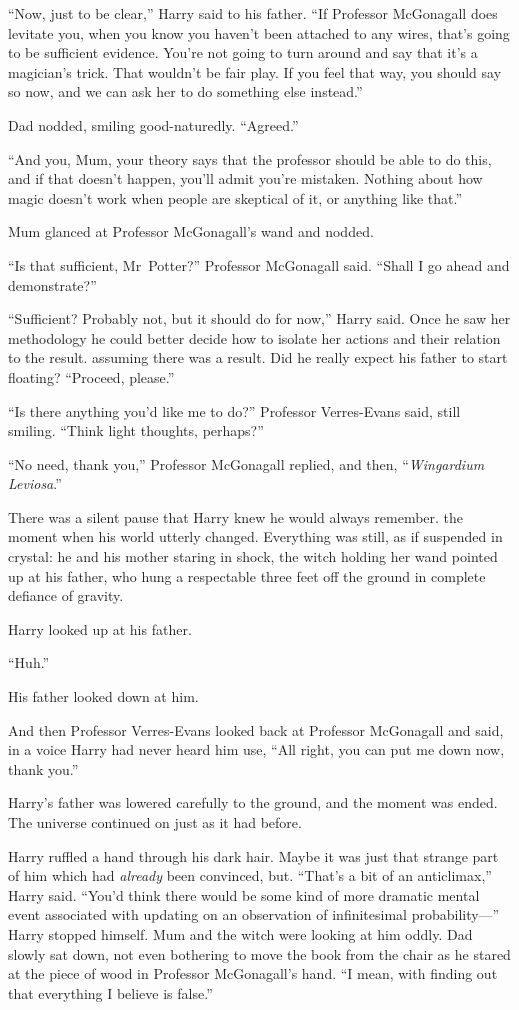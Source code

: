 “Now, just to be clear,” Harry said to his father. “If Professor
McGonagall does levitate you, when you know you haven’t
been attached to any wires, that’s going to be sufficient
evidence. You’re not going to turn around and say that it’s
a magician’s trick. That wouldn’t be fair play. If you feel
that way, you should say so now, and we can ask her to
do something else instead.”

Dad nodded, smiling good-naturedly. “Agreed.”

“And you, Mum, your theory says that the professor
should be able to do this, and if that doesn’t happen,
you’ll admit you’re mistaken. Nothing about how magic
doesn’t work when people are skeptical of it, or anything
like that.”

Mum glanced at Professor McGonagall’s wand and nodded.

“Is that sufficient, Mr~Potter?” Professor McGonagall said.
“Shall I go ahead and demonstrate?”

“Sufficient? Probably not, but it should do for now,” Harry
said. Once he saw her methodology he could better decide
how to isolate her actions and their relation to the result.
assuming there was a result. Did he really expect his
father to start floating? “Proceed, please.”

“Is there anything you’d like me to do?” Professor
Verres-Evans said, still smiling. “Think light thoughts,
perhaps?”

“No need, thank you,” Professor McGonagall replied, and
then, “\emph{Wingardium Leviosa}.”

There was a silent pause that Harry knew he would
always remember. the moment when his world utterly
changed. Everything was still, as if suspended in crystal:
he and his mother staring in shock, the witch holding her
wand pointed up at his father, who hung a respectable
three feet off the ground in complete defiance of gravity.

Harry looked up at his father.

“Huh.”

His father looked down at him.

And then Professor Verres-Evans looked back at Professor
McGonagall and said, in a voice Harry had never heard him
use, “All right, you can put me down now, thank you.”

Harry’s father was lowered carefully to the ground, and the
moment was ended. The universe continued on just as it had before.

Harry ruffled a hand through his dark hair. Maybe it was
just that strange part of him which had \emph{already} been
convinced, but. “That’s a bit of an anticlimax,” Harry said.
“You’d think there would be some kind of more dramatic
mental event associated with updating on an observation of
infinitesimal probability—” Harry stopped himself. Mum and
the witch were looking at him oddly. Dad slowly sat down,
not even bothering to move the book from the chair as
he stared at the piece of wood in Professor McGonagall’s
hand. “I mean, with finding out that everything I believe is false.”

